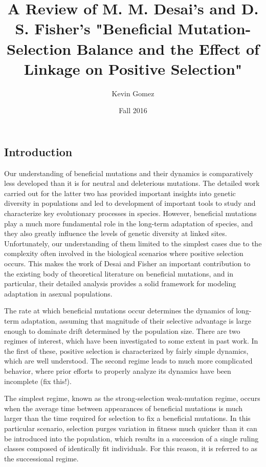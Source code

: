 \documentclass[12pt,twocolumn]{article}
\title{A Review of M. M. Desai's and D. S. Fisher's "Beneficial Mutation-Selection Balance and the Effect of Linkage on Positive Selection"}
\date{Fall 2016}
\author{Kevin Gomez}
\begin{document}
\maketitle
\newpage


\newpage
\subsection*{Introduction}
Our understanding of beneficial mutations and their dynamics is comparatively less developed than it is for neutral and deleterious mutations.  The detailed work carried out for the latter two has provided important insights into genetic diversity in populations and led to development of important tools to study and characterize key evolutionary processes in species.  However, beneficial mutations play a much more fundamental role in the long-term adaptation of species, and they also greatly influence the levels of genetic diversity at linked sites.  Unfortunately, our understanding of them limited to the simplest cases due to the complexity often involved in the biological scenarios where positive selection occurs.  This makes the work of Desai and Fisher an important contribution to the existing body of theoretical literature on beneficial mutations, and in particular, their detailed analysis provides a solid framework for modeling adaptation in asexual populations.  

The rate at which beneficial mutations occur determines the dynamics of long-term adaptation, assuming that magnitude of their selective advantage is large enough to dominate drift determined by the population size.  There are two regimes of interest, which have been investigated to some extent in past work.  In the first of these, positive selection is characterized by fairly simple dynamics, which are well understood.  The second regime leads to much more complicated behavior, where prior efforts to properly analyze its dynamics have been incomplete (fix this!).        

The simplest regime, known as the strong-selection weak-mutation regime, occurs when the average time between appearances of beneficial mutations is much larger than the time required for selection to fix a beneficial mutations.  In this particular scenario, selection purges variation in fitness much quicker than it can be introduced into the population, which results in a succession of a single ruling classes composed of identically fit individuals.  For this reason, it is referred to as the successional regime.  
\end{document}
